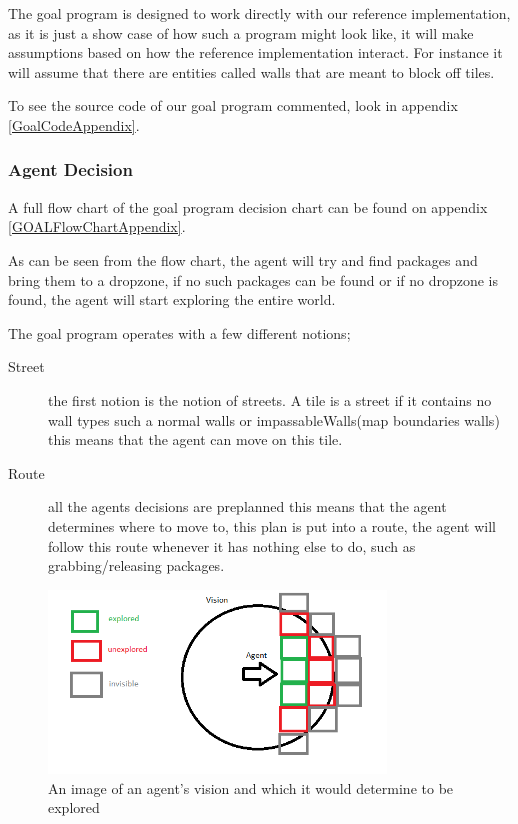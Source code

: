 The goal program is designed to work directly with our reference implementation,
as it is just a show case of how such a program might look like, it
will make assumptions based on how the reference implementation interact.
For instance it will assume that there are entities called walls that
are meant to block off tiles. 

To see the source code of our goal program commented, look in appendix
\ref{GoalCodeAppendix}.


\subsubsection{Agent Decision}

A full flow chart of the goal program decision chart can be found
on appendix \ref{GOALFlowChartAppendix}.

As can be seen from the flow chart, the agent will try and find packages
and bring them to a dropzone, if no such packages can be found or
if no dropzone is found, the agent will start exploring the entire
world.

The goal program operates with a few different notions; 
\begin{description}
\item [{Street}] the first notion is the notion of streets. A tile is a
street if it contains no wall types such a normal walls or impassableWalls(map
boundaries walls) this means that the agent can move on this tile.
\item [{Route}] all the agents decisions are preplanned this means that
the agent determines where to move to, this plan is put into a route,
the agent will follow this route whenever it has nothing else to do,
such as grabbing/releasing packages.
\end{description}
\begin{figure}
\begin{centering}
\includegraphics[width=0.8\textwidth]{VisionExploredGOALAgent}
\par\end{centering}

\caption{An image of an agent\textquoteright{}s vision and which it would determine
to be explored}
\end{figure}

